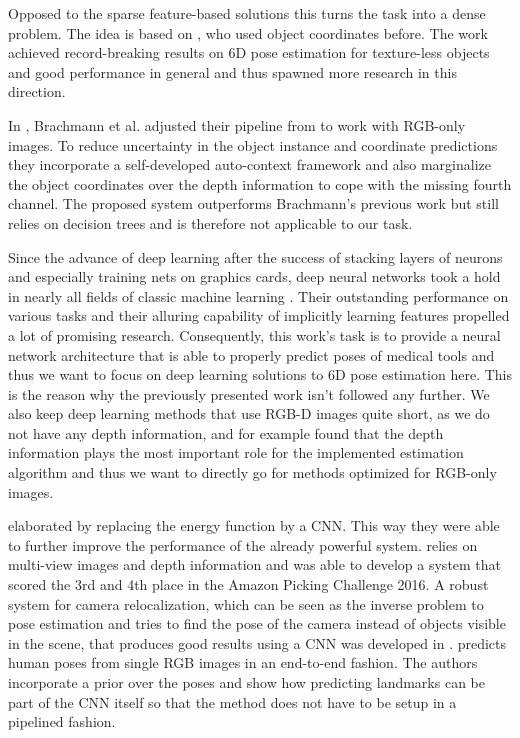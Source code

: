 Opposed to the sparse feature-based solutions this turns the task into a dense problem. The idea is based on \cite{tsharp}, who used object coordinates before. The work achieved record-breaking results on 6D pose estimation for texture-less objects and good performance in general and thus spawned more research in this direction.

In \cite{brachmann2}, Brachmann et al. adjusted their pipeline from \cite{brachmann1} to work with RGB-only images. To reduce uncertainty in the object instance and coordinate predictions they incorporate a self-developed auto-context framework and also marginalize the object coordinates over the depth information to cope with the missing fourth channel. The proposed system outperforms Brachmann's previous work but still relies on decision trees and is therefore not applicable to our task.

Since the advance of deep learning after the success of stacking layers of neurons and especially training nets on graphics cards, deep neural networks took a hold in nearly all fields of classic machine learning \cite{ylecun}. Their outstanding performance on various tasks and their alluring capability of implicitly learning features propelled a lot of promising research. Consequently, this work's task is to provide a neural network architecture that is able to properly predict poses of medical tools and thus we want to focus on deep learning solutions to 6D pose estimation here. This is the reason why the previously presented work isn’t followed any further. We also keep deep learning methods that use RGB-D images quite short, as we do not have any depth information, and for example \cite{pertsch} found that the depth information plays the most important role for the implemented estimation algorithm and thus we want to directly go for methods optimized for RGB-only images.

\cite{akrull} elaborated \cite{brachmann1} by replacing the energy function by a CNN. This way they were able to further improve the performance of the already powerful system. \cite{azeng} relies on multi-view images and depth information and was able to develop a system that scored the 3rd and 4th place in the Amazon Picking Challenge 2016. A robust system for camera relocalization, which can be seen as the inverse problem to pose estimation and tries to find the pose of the camera instead of objects visible in the scene, that produces good results using a CNN was developed in \cite{posenet}. \cite{dtome} predicts human poses from single RGB images in an end-to-end fashion. The authors incorporate a prior over the poses and show how predicting landmarks can be part of the CNN itself so that the method does not have to be setup in a pipelined fashion.


